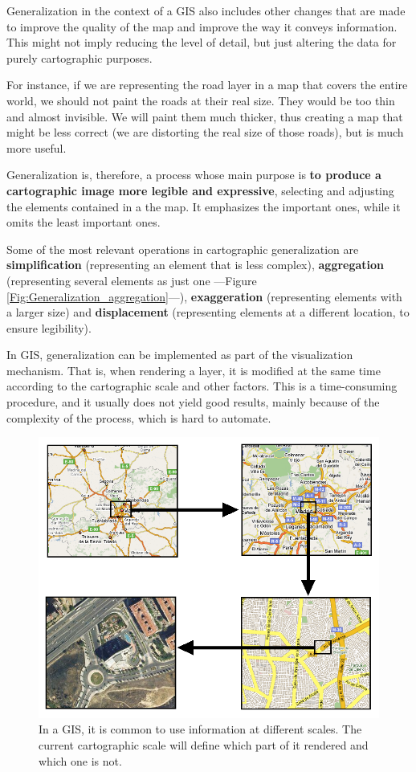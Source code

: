 Generalization in the context of a GIS also includes other changes that are made to improve the quality of the map and improve the way it conveys information. This might not imply reducing the level of detail, but just altering the data for purely cartographic purposes.

For instance, if we are representing the road layer in a map that covers the entire world, we should not paint the roads at their real size. They would be too thin and almost invisible. We will paint them much thicker, thus creating a map that might be less correct (we are distorting the real size of those roads), but is much more useful.

Generalization is, therefore, a process whose main purpose is \textbf{to produce a cartographic image more legible and expressive}, selecting and adjusting the elements contained in a the map. It emphasizes the important ones, while it omits the least important ones.

Some of the most relevant operations in cartographic generalization are \textbf{simplification} (representing an element that is less complex), \textbf{aggregation} (representing several elements as just one ---Figure \ref{Fig:Generalization_aggregation}---), \textbf{exaggeration} (representing elements with a larger size) and \textbf{displacement} (representing elements at a different location, to ensure legibility).


In GIS, generalization can be implemented as part of the visualization mechanism. That is, when rendering a layer, it is modified at the same time according to the cartographic scale and other factors. This is a time-consuming procedure, and it usually does not yield good results, mainly because of the complexity of the process, which is hard to automate.

\begin{figure}[!hbt]
\centering
\includegraphics[width=\textwidth]{Cartography/GIS_multi_scale.png}
\caption{\small In a GIS, it is common to use information at different scales. The current cartographic scale will define which part of it rendered and which one is not.}
\label{Fig:GIS_multi_scale} 
\end{figure}

